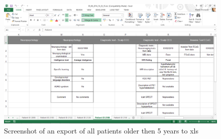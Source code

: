 \documentclass[thesis=B,english]{FITthesis}[2012/10/20]
\begin{document}
\begin{figure}[ht]\centering
\includegraphics[width=0.6\paperwidth]{xlsExport_2}
		\caption{Screenshot of an export of all patients older then 5 years to xls}
\end{figure}
\end{document}
